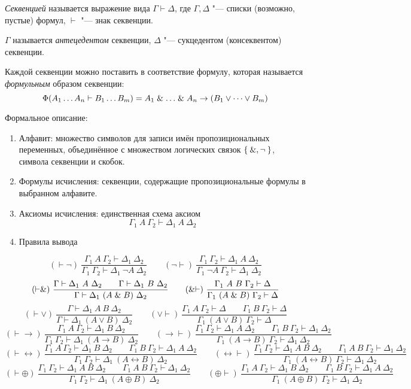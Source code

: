 \begin{definition}
	\emph{Секвенцией} называется выражение вида $ \Gamma \vdash \Delta $, где $ \Gamma, \Delta $ "--- списки (возможно, пустые) формул, $ \vdash $ "--- знак секвенции.

	$ \Gamma $ называется \emph{антецедентом} секвенции, $ \Delta $ "--- сукцедентом (консеквентом) секвенции.
\end{definition}

Каждой секвенции можно поставить в соответствие формулу, которая называется \emph{формульным} образом секвенции:
$$ \Phi(A_1 \dots A_n \vdash B_1 \dots B_m) = A_1 \mathrel\& \dots \mathrel\& A_n \to (B_1 \vee \dots \vee B_m) $$

Формальное описание:
\begin{enumerate}
	\item Алфавит: множество символов для записи имён пропозициональных переменных, объединённое с множеством логических связок $ \Set{\ensuremath{\mathrel\&}, \neg} $, символа секвенции и скобок.
	\item Формулы исчисления: секвенции, содержащие пропозициональные формулы в выбранном алфавите.
	\item Аксиомы исчисления: единственная схема аксиом
		$$ \Gamma_1~A~\Gamma_2 \vdash \Delta_1~A~\Delta_2 $$
	\item Правила вывода
\end{enumerate}

$$ (\vdash \neg) ~ \frac{\Gamma_1~A~\Gamma_2 \vdash \Delta_1~\Delta_2}{\Gamma_1~\Gamma_2 \vdash \Delta_1~\neg A~\Delta_2} \qquad (\neg \vdash) ~ \frac{\Gamma_1~\Gamma_2 \vdash \Delta_1~A~\Delta_2}{\Gamma_1~\neg A~\Gamma_2 \vdash \Delta_1~\Delta_2} $$
$$ (\vdash \mathrel\&) ~ \frac{\Gamma \vdash \Delta_1~A~\Delta_2 \qquad \Gamma \vdash \Delta_1~B~\Delta_2}{\Gamma \vdash \Delta_1~(A \mathrel\& B)~\Delta_2} \qquad (\mathrel\& \vdash) ~ \frac{\Gamma_1~A~B~\Gamma_2 \vdash \Delta}{\Gamma_1~(A \mathrel\& B)~\Gamma_2 \vdash \Delta} $$
$$ (\vdash \vee) ~ \frac{\Gamma \vdash \Delta_1~A~B~\Delta_2}{\Gamma \vdash \Delta_1~(A \vee B)~\Delta_2} \qquad (\vee \vdash) ~ \frac{\Gamma_1~A~\Gamma_2 \vdash \Delta \qquad \Gamma_1~B~\Gamma_2 \vdash \Delta}{\Gamma_1~(A \vee B)~\Gamma_2 \vdash \Delta} $$
$$ (\vdash \to) ~ \frac{\Gamma_1~A~\Gamma_2 \vdash \Delta_1~B~\Delta_2}{\Gamma_1~\Gamma_2 \vdash \Delta_1~(A \to B)~\Delta_2} \qquad (\to \vdash) ~ \frac{\Gamma_1~\Gamma_2 \vdash \Delta_1~A~\Delta_2 \qquad \Gamma_1~B~\Gamma_2 \vdash \Delta_1~\Delta_2}{\Gamma_1~(A \to B)~\Gamma_2 \vdash \Delta_1~\Delta_2} $$
$$ (\vdash \leftrightarrow) ~ \frac{\Gamma_1~A~\Gamma_2 \vdash \Delta_1~B~\Delta_2 \qquad \Gamma_1~B~\Gamma_2 \vdash \Delta_1~A~\Delta_2}{\Gamma_1~\Gamma_2 \vdash \Delta_1~(A \leftrightarrow B)~\Delta_2} \qquad (\leftrightarrow \vdash) ~ \frac{\Gamma_1~\Gamma_2 \vdash \Delta_1~A~B~\Delta_2 \qquad \Gamma_1~A~B~\Gamma_2 \vdash \Delta_1~\Delta_2}{\Gamma_1~(A \leftrightarrow B)~\Gamma_2 \vdash \Delta_1~\Delta_2} $$
$$ (\vdash \oplus) ~ \frac{\Gamma_1~\Gamma_2 \vdash \Delta_1~A~B~\Delta_2 \qquad \Gamma_1~A~B~\Gamma_2 \vdash \Delta_1~\Delta_2}{\Gamma_1~\Gamma_2 \vdash \Delta_1~(A \oplus B)~\Delta_2} \qquad (\oplus \vdash) ~ \frac{\Gamma_1~A~\Gamma_2 \vdash \Delta_1~B~\Delta_2 \qquad \Gamma_1~B~\Gamma_2 \vdash \Delta_1~A~\Delta_2}{\Gamma_1~(A \oplus B)~\Gamma_2 \vdash \Delta_1~\Delta_2} $$

